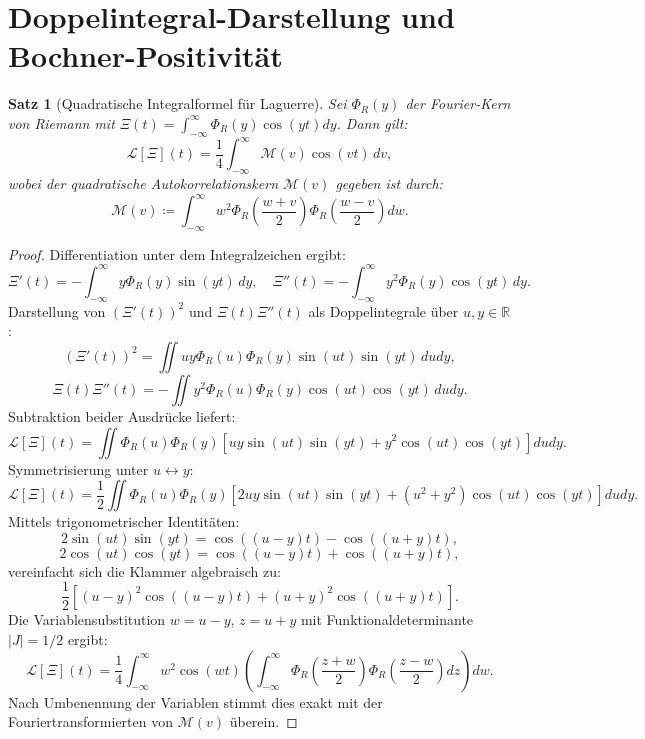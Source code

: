 \documentclass[11pt,a4paper]{article}
\newtheorem{theorem}{Satz}[section]
\theoremstyle{definition}
\theoremstyle{remark}
\begin{document}
\section{Doppelintegral-Darstellung und Bochner-Positivität}

\begin{theorem}[Quadratische Integralformel für Laguerre]
Sei $\Phi_R(y)$ der Fourier-Kern von Riemann mit $\Xi(t) = \int_{-\infty}^\infty \Phi_R(y) \cos(yt) dy$. Dann gilt:
\begin{equation}
\mathcal{L}[\Xi](t) = \frac{1}{4}\int_{-\infty}^\infty \mathcal{M}(v) \cos(vt)\, dv,
\end{equation}
wobei der quadratische Autokorrelationskern $\mathcal{M}(v)$ gegeben ist durch:
\begin{equation}
\mathcal{M}(v) \coloneqq \int_{-\infty}^\infty w^2 \Phi_R\left(\frac{w+v}{2}\right) \Phi_R\left(\frac{w-v}{2}\right) dw.
\end{equation}
\end{theorem}

\begin{proof}
Differentiation unter dem Integralzeichen ergibt:
\[
\Xi'(t) = -\int_{-\infty}^\infty y \Phi_R(y) \sin(yt)\, dy, \quad \Xi''(t) = -\int_{-\infty}^\infty y^2 \Phi_R(y) \cos(yt)\, dy.
\]
Darstellung von $(\Xi'(t))^2$ und $\Xi(t)\Xi''(t)$ als Doppelintegrale über $u, y \in \mathbb{R}$:
\[
(\Xi'(t))^2 = \iint u y \Phi_R(u)\Phi_R(y) \sin(ut)\sin(yt)\, du dy,
\]
\[
\Xi(t)\Xi''(t) = -\iint y^2 \Phi_R(u)\Phi_R(y) \cos(ut)\cos(yt)\, du dy.
\]
Subtraktion beider Ausdrücke liefert:
\[
\mathcal{L}[\Xi](t) = \iint \Phi_R(u)\Phi_R(y) \left[ u y \sin(ut)\sin(yt) + y^2 \cos(ut)\cos(yt) \right] du dy.
\]
Symmetrisierung unter $u \leftrightarrow y$:
\[
\mathcal{L}[\Xi](t) = \frac{1}{2} \iint \Phi_R(u)\Phi_R(y) \left[ 2 u y \sin(ut)\sin(yt) + (u^2 + y^2) \cos(ut)\cos(yt) \right] du dy.
\]
Mittels trigonometrischer Identitäten:
\[
2\sin(ut)\sin(yt) = \cos((u-y)t) - \cos((u+y)t),
\]
\[
2\cos(ut)\cos(yt) = \cos((u-y)t) + \cos((u+y)t),
\]
vereinfacht sich die Klammer algebraisch zu:
\[
\frac{1}{2} \left[ (u - y)^2 \cos((u-y)t) + (u + y)^2 \cos((u+y)t) \right].
\]
Die Variablensubstitution $w = u - y$, $z = u + y$ mit Funktionaldeterminante $|J| = 1/2$ ergibt:
\[
\mathcal{L}[\Xi](t) = \frac{1}{4} \int_{-\infty}^\infty w^2 \cos(wt) \left( \int_{-\infty}^\infty \Phi_R\left(\frac{z+w}{2}\right) \Phi_R\left(\frac{z-w}{2}\right) dz \right) dw.
\]
Nach Umbenennung der Variablen stimmt dies exakt mit der Fouriertransformierten von $\mathcal{M}(v)$ überein.
\end{proof}
\end{document}

